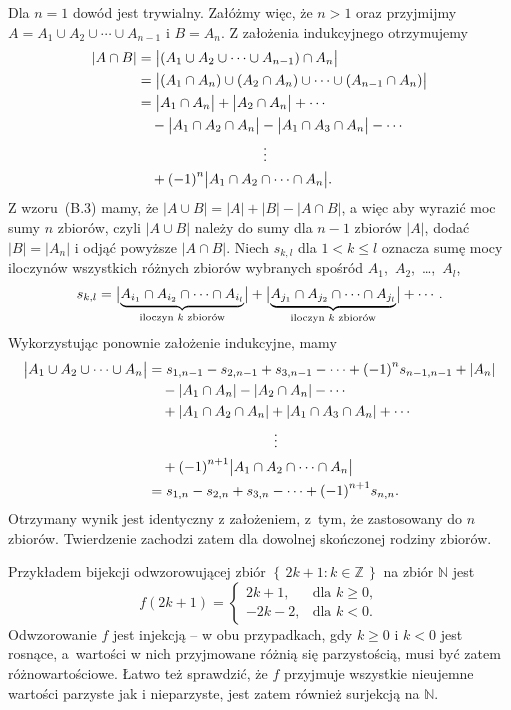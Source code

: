 Dla $n=1$ dowód jest trywialny. Załóżmy więc, że $n>1$ oraz przyjmijmy $A=A_1\cup A_2\cup\cdots\cup A_{n-1}$ i $B=A_n$. Z założenia indukcyjnego otrzymujemy
\[
	\begin{split}
		|A\cap B| &= \bigl|(A_1\cup A_2\cup\cdots\cup A_{n-1})\cap A_n\bigr| \\
		&= \bigl|(A_1\cap A_n)\cup(A_2\cap A_n)\cup\cdots\cup(A_{n-1}\cap A_n)\bigr| \\
		&= \bigl|A_1\cap A_n\bigr|+\bigl|A_2\cap A_n\bigr|+\cdots \\
		&\quad -\bigl|A_1\cap A_2\cap A_n\bigr|-\bigl|A_1\cap A_3\cap A_n\bigr|-\cdots \\
		&\hspace{1.25in}\vdots \\
		&\quad +{(-1)}^n\bigl|A_1\cap A_2\cap\cdots\cap A_n\bigr|.
	\end{split}
\]
Z wzoru~(B.3) mamy, że $|A\cup B|=|A|+|B|-|A\cap B|$, a więc aby wyrazić moc sumy $n$ zbiorów, czyli $|A\cup B|$ należy do sumy dla $n-1$ zbiorów $|A|$, dodać $|B|=|A_n|$ i odjąć powyższe $|A\cap B|$. Niech $s_{k,l}$ dla $1<k\le l$ oznacza sumę mocy iloczynów wszystkich  różnych zbiorów wybranych spośród $A_1$,~$A_2$,~\dots,~$A_l$,
\[
	s_{k,l} = \bigl|\underbrace{A_{i_1}\cap A_{i_2}\cap\cdots\cap A_{i_l}}_{\text{\scriptsize iloczyn $k$ zbiorów}}\bigr|+\bigl|\underbrace{A_{j_1}\cap A_{j_2}\cap\cdots\cap A_{j_l}}_{\text{\scriptsize iloczyn $k$ zbiorów}}\bigr|+\cdots.
\]
Wykorzystując ponownie założenie indukcyjne, mamy
\[
	\begin{split}
		\bigl|A_1\cup A_2\cup\cdots\cup A_n\bigr| &= s_{1,{n-1}}-s_{2,{n-1}}+s_{3,{n-1}}-\cdots+{(-1)}^ns_{{n-1},{n-1}}+|A_n| \\
		&\quad -|A_1\cap A_n|-|A_2\cap A_n|-\cdots \\
		&\quad +|A_1\cap A_2\cap A_n|+|A_1\cap A_3\cap A_n|+\cdots \\
		&\hspace{1.25in}\vdots \\
		&\quad +{(-1)}^{n+1}\bigl|A_1\cap A_2\cap\cdots\cap A_n\bigr| \\
		&= s_{1,n}-s_{2,n}+s_{3,n}-\cdots+{(-1)}^{n+1}s_{n,n}.
	\end{split}
\]
Otrzymany wynik jest identyczny z założeniem, z~tym, że zastosowany do $n$ zbiorów. Twierdzenie zachodzi zatem dla dowolnej skończonej rodziny zbiorów.

\exercise{} %
Przykładem bijekcji odwzorowującej zbiór $\left\{\,2k+1:k\in\mathbb{Z}\,\right\}$ na zbiór $\mathbb{N}$ jest
\[
	f(2k+1) =
	\begin{cases}
		2k+1, & \text{dla $k\ge0$}, \\
		-2k-2, & \text{dla $k<0$}.
	\end{cases}
\]
Odwzorowanie $f$ jest injekcją -- w obu przypadkach, gdy $k\ge0$ i $k<0$ jest rosnące, a~wartości w nich przyjmowane różnią się parzystością, musi być zatem różnowartościowe. Łatwo też sprawdzić, że $f$ przyjmuje wszystkie nieujemne wartości parzyste jak i nieparzyste, jest zatem również surjekcją na $\mathbb{N}$.

